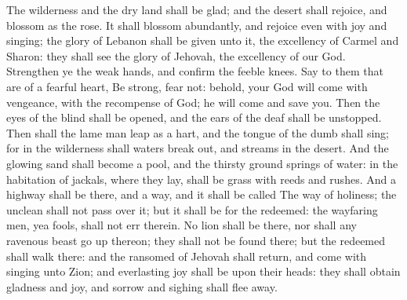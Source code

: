 The wilderness and the dry land shall be glad; and the desert shall rejoice, and blossom as the rose. It shall blossom abundantly, and rejoice even with joy and singing; the glory of Lebanon shall be given unto it, the excellency of Carmel and Sharon: they shall see the glory of Jehovah, the excellency of our God.  Strengthen ye the weak hands, and confirm the feeble knees. Say to them that are of a fearful heart, Be strong, fear not: behold, your God will come with vengeance, with the recompense of God; he will come and save you.  Then the eyes of the blind shall be opened, and the ears of the deaf shall be unstopped. Then shall the lame man leap as a hart, and the tongue of the dumb shall sing; for in the wilderness shall waters break out, and streams in the desert. And the glowing sand shall become a pool, and the thirsty ground springs of water: in the habitation of jackals, where they lay, shall be grass with reeds and rushes. And a highway shall be there, and a way, and it shall be called The way of holiness; the unclean shall not pass over it; but it shall be for the redeemed: the wayfaring men, yea fools, shall not err therein. No lion shall be there, nor shall any ravenous beast go up thereon; they shall not be found there; but the redeemed shall walk there: and the ransomed of Jehovah shall return, and come with singing unto Zion; and everlasting joy shall be upon their heads: they shall obtain gladness and joy, and sorrow and sighing shall flee away. 

